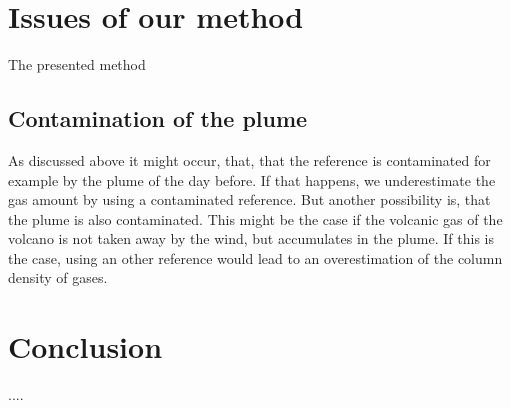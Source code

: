 \documentclass  [
  paper    = a4,
  BCOR     = 10mm,
  twoside,
  fontsize = 12pt,
  fleqn,
  toc      = bibnumbered,
  toc      = listofnumbered,
  numbers  = noendperiod,
  headings = normal,
  listof   = leveldown,
  version  = 3.03
]                                       {scrreprt}
\begin{document}
	\chapter{Issues of our method}
	The presented method 
	\section{Contamination of the plume}
	
	 As discussed above it might occur, that, that the reference is contaminated for example by the plume of the day before. If that happens, we underestimate the gas amount by using a contaminated reference. But another possibility is, that the plume is also contaminated. This might be the case if the volcanic gas of the volcano is not taken away by the wind, but accumulates in the plume. If this is the case, using an other reference would lead to an overestimation of the column density of gases.


	\chapter{Conclusion}
	....
	
	
	
\end{document}
